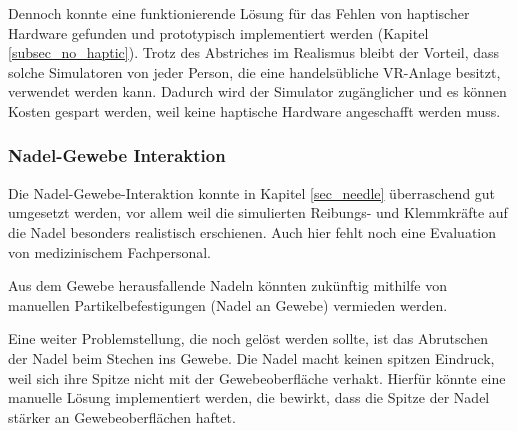 Dennoch konnte eine funktionierende Lösung für das Fehlen von haptischer Hardware gefunden und prototypisch implementiert werden (Kapitel \ref{subsec_no_haptic}). %
Trotz des Abstriches im Realismus bleibt der Vorteil, dass solche Simulatoren von jeder Person, die eine handelsübliche VR-Anlage besitzt, verwendet werden kann. Dadurch wird der Simulator zugänglicher und es können Kosten gespart werden, weil keine haptische Hardware angeschafft werden muss.

\subsubsection{Nadel-Gewebe Interaktion}
Die Nadel-Gewebe-Interaktion konnte in Kapitel \ref{sec_needle} überraschend gut umgesetzt werden, vor allem weil die simulierten Reibungs- und Klemmkräfte auf die Nadel besonders realistisch erschienen. Auch hier fehlt noch eine Evaluation von medizinischem Fachpersonal.

Aus dem Gewebe herausfallende Nadeln könnten zukünftig mithilfe von manuellen Partikelbefestigungen (Nadel an Gewebe) vermieden werden.

Eine weiter Problemstellung, die noch gelöst werden sollte, ist das Abrutschen der Nadel beim Stechen ins Gewebe. Die Nadel macht keinen spitzen Eindruck, weil sich ihre Spitze nicht mit der Gewebeoberfläche verhakt. Hierfür könnte eine manuelle Lösung implementiert werden, die bewirkt, dass die Spitze der Nadel stärker an Gewebeoberflächen haftet.










